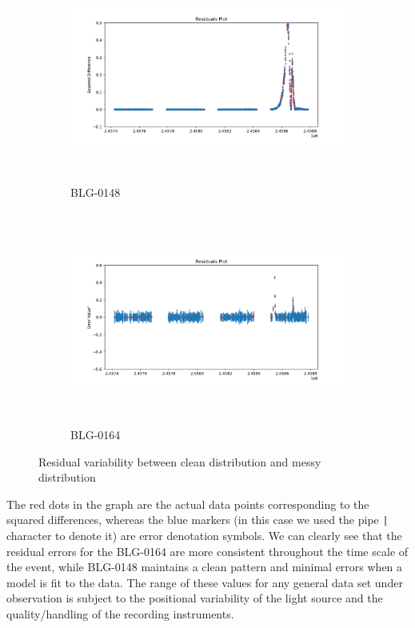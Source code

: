 \documentclass{article}
\begin{document}
        \begin{figure}[H]
            \begin{subfigure}{0.5\textwidth}
                \includegraphics[width=1\linewidth, height=7cm]{Images/2019-BLG-0148_Residuals.png} 
                \caption{BLG-0148}
                \label{fig:Sub-Event-One-Main}
            \end{subfigure}
            \begin{subfigure}{0.5\textwidth}
                \includegraphics[width=1\linewidth, height=7cm]{Images/2019-BLG-0164_Residuals.png}
                \caption{BLG-0164}
                \label{fig:Sub-Event-One-Alt}
            \end{subfigure}
        \caption{Residual variability between clean distribution and messy distribution}
        \label{fig:image2}
        \end{figure}
        
The red dots in the graph are the actual data points corresponding to the squared differences, whereas the blue markers (in this case we used the pipe \texttt{|} character to denote it) are error denotation symbols. We can clearly see that the residual errors for the BLG-0164 are more consistent throughout the time scale of the event, while BLG-0148 maintains a clean pattern and minimal errors when a model is fit to the data. The range of these values for any general data set under observation is subject to the positional variability of the light source and the quality/handling of the recording instruments.
\end{document}
